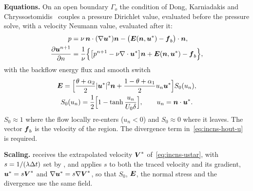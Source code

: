 \textbf{Equations.} On an open boundary $\Gamma_o$ the condition of Dong,
Karniadakis and Chryssostomidis~\cite{DongKC2014} couples a pressure Dirichlet
value, evaluated before the pressure solve, with a velocity Neumann value,
evaluated after it:
\begin{align}
  p &= \nu\,\boldsymbol{n}\cdot(\nabla\boldsymbol{u}^*)\boldsymbol{n}
       - \bigl(\boldsymbol{E}(\boldsymbol{n},\boldsymbol{u}^*)-\boldsymbol{f}_b\bigr)\cdot\boldsymbol{n},
  \label{eq:incns-hout-p}\\
  \frac{\partial\boldsymbol{u}^{n+1}}{\partial n} &= \frac{1}{\nu}\Bigl\{
       \bigl[p^{n+1}-\nu\nabla\cdot\boldsymbol{u}^*\bigr]\boldsymbol{n}
       + \boldsymbol{E}(\boldsymbol{n},\boldsymbol{u}^*)-\boldsymbol{f}_b\Bigr\},
  \label{eq:incns-hout-u}
\end{align}
with the backflow energy flux and smooth switch
\begin{equation}
  \begin{gathered}
  \boldsymbol{E}=\Bigl[\frac{\theta+\alpha_2}{2}|\boldsymbol{u}^*|^2\boldsymbol{n}
  + \frac{1-\theta+\alpha_1}{2}u_n\boldsymbol{u}^*\Bigr]S_0(u_n),\\
  S_0(u_n)=\frac12\Bigl[1-\tanh\frac{u_n}{U_0\delta}\Bigr],\qquad
  u_n=\boldsymbol{n}\cdot\boldsymbol{u}^*.
  \end{gathered}
  \label{eq:incns-hout-e}
\end{equation}
$S_0\approx1$ where the flow locally re-enters ($u_n<0$) and $S_0\approx0$
where it leaves. The vector $\boldsymbol{f}_b$ is the velocity  of the
region. The divergence term in~\eqref{eq:incns-hout-u} is required.

\textbf{Scaling.}  receives the extrapolated
velocity $\boldsymbol{V}^*$ of~\eqref{eq:incns-ustar}, with
$s=1/(\lambda\Delta t)$ set by , and applies $s$ to both the
traced velocity and its gradient, $\boldsymbol{u}^*=s\boldsymbol{V}^*$ and
$\nabla\boldsymbol{u}^*=s\nabla\boldsymbol{V}^*$, so that $S_0$, $\boldsymbol{E}$, the
normal stress and the divergence use the same field.

